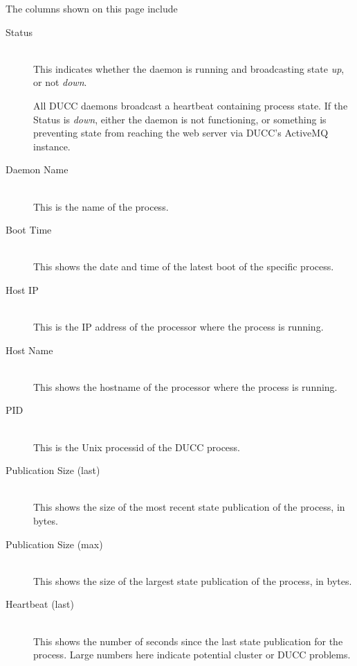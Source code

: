 The columns shown on this page include

   \begin{description}
      \item[Status] \hfill \\
        This indicates whether the daemon is running and broadcasting state {\em up},
        or not {\em down}.  
        
        All DUCC daemons broadcast a heartbeat containing process state.  If the Status
        is {\em down}, either the daemon is not functioning, or something is preventing
        state from reaching the web server via DUCC's ActiveMQ instance.

      \item[Daemon Name] \hfill \\
        This is the name of the process.

      \item[Boot Time] \hfill \\ 
        This shows the date and time of the latest boot of the specific process.
          
      \item[Host IP] \hfill \\ 
        This is the IP address of the processor where the process is running.

      \item[Host Name] \hfill \\ 
        This shows the hostname of the processor where the process is running.

      \item[PID] \hfill \\ 
        This is the Unix processid of the DUCC process.


      \item[Publication Size (last)] \hfill \\ 
        This shows the size of the most recent state publication of the process, in bytes.

      \item[Publication Size (max)] \hfill \\ 
        This shows the size of the largest state publication of the process, in bytes.

      \item[Heartbeat (last)] \hfill \\ 
        This shows the number of seconds since the last state publication for the process. 
         Large numbers here indicate potential cluster or DUCC problems.


\end{description}
